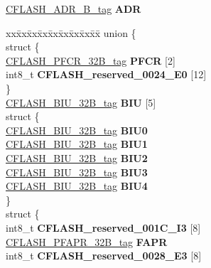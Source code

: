 \begin{DoxyCompactItemize}
\mbox{\hyperlink{unionCFLASH__ADR__32B__tag}{C\+F\+L\+A\+S\+H\+\_\+\+A\+D\+R\+\_\+B\+\_\+tag}} {\bfseries A\+DR}
\item 
\mbox{\label{structCFLASH__struct__tag_a0a04c2dc6769fd2458718f15e1aef6e9}} 
\begin{tabbing}
xx\=xx\=xx\=xx\=xx\=xx\=xx\=xx\=xx\=\kill
union \{\\
\mbox{\label{unionCFLASH__struct__tag_1_1_0D1501_a1dedfdc6db8be96929e9a152538ade55}} 
\>struct \{\\
\>\>\mbox{\hyperlink{unionCFLASH__PFCR__32B__tag}{CFLASH\_PFCR\_32B\_tag}} {\bfseries PFCR} \mbox{[}2\mbox{]}\\
\>\>int8\_t {\bfseries CFLASH\_reserved\_0024\_E0} \mbox{[}12\mbox{]}\\
\>\} \\
\>\mbox{\hyperlink{unionCFLASH__BIU__32B__tag}{CFLASH\_BIU\_32B\_tag}} {\bfseries BIU} \mbox{[}5\mbox{]}\\
\mbox{\label{unionCFLASH__struct__tag_1_1_0D1501_ac494da9af707dde5082266ceb6fa121f}} 
\>struct \{\\
\>\>\mbox{\hyperlink{unionCFLASH__BIU__32B__tag}{CFLASH\_BIU\_32B\_tag}} {\bfseries BIU0}\\
\>\>\mbox{\hyperlink{unionCFLASH__BIU__32B__tag}{CFLASH\_BIU\_32B\_tag}} {\bfseries BIU1}\\
\>\>\mbox{\hyperlink{unionCFLASH__BIU__32B__tag}{CFLASH\_BIU\_32B\_tag}} {\bfseries BIU2}\\
\>\>\mbox{\hyperlink{unionCFLASH__BIU__32B__tag}{CFLASH\_BIU\_32B\_tag}} {\bfseries BIU3}\\
\>\>\mbox{\hyperlink{unionCFLASH__BIU__32B__tag}{CFLASH\_BIU\_32B\_tag}} {\bfseries BIU4}\\
\>\} \\
\mbox{\label{unionCFLASH__struct__tag_1_1_0D1501_acffbc1d3d90d2bd6380f05ef2b7c74ac}} 
\>struct \{\\
\>\>int8\_t {\bfseries CFLASH\_reserved\_001C\_I3} \mbox{[}8\mbox{]}\\
\>\>\mbox{\hyperlink{unionCFLASH__PFAPR__32B__tag}{CFLASH\_PFAPR\_32B\_tag}} {\bfseries FAPR}\\
\>\>int8\_t {\bfseries CFLASH\_reserved\_0028\_E3} \mbox{[}8\mbox{]}\\

\end{tabbing}
\end{DoxyCompactItemize}
